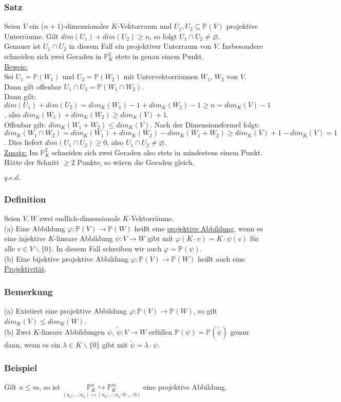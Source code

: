 \documentclass[a4paper]{article}
\newcommand{\ul}{\underline}
\renewcommand{\proof}{\ul{Beweis:}\\}
\renewcommand{\qed}{\begin{flushright}
\ul{\(q.e.d.\)}
\end{flushright}}
\let\phi\varphi
\begin{document}
\subsubsection{Satz}
Seien \(V\) ein (\(n+1\))-dimensionaler \(K\)-Vektorraum und \(U_1,U_2\subseteq\mathbb{P}(V)\) projektive Unterräume. Gilt \(dim(U_1)+dim(U_2)\geq n\), so folgt \(U_1\cap U_2\ne\varnothing\).\\
Genauer ist \(U_1\cap U_2\) in diesem Fall ein projektiver Unterraum von \(V\). Insbesondere schneiden sich zwei Geraden in \(\mathbb{P}_K^2\) stets in genau einem Punkt.\\
\proof
Sei \(U_1=\mathbb{P}(W_1)\) und \(U_2=\mathbb{P}(W_2)\) mit Untervektorräumen \(W_1\), \(W_2\) von \(V\). Dann gilt offenbar \(U_1\cap U_2=\mathbb{P}(W_1\cap W_2)\).\\
Dann gilt: \(dim(U_1)+dim(U_2)=dim_K(W_1)-1+dim_K(W_2)-1\geq n=dim_K(V)-1\), also \(dim_K(W_1)+dim_K(W_2)\geq dim_K(V)+1\).\\
Offenbar gilt: \(dim_K(W_1+W_2)\leq dim_K(V)\). Nach der Dimensionsformel folgt:\\
\(dim_K(W_1\cap W_2)=dim_K(W_1)+dim_K(W_2)-dim_K(W_1+W_2)\geq dim_K(V)+1-dim_K(V)=1\). Dies liefert \(dim(U_1\cap U_2)\geq 0\), also \(U_1\cap U_2\neq \varnothing\).\\
\ul{Zusatz:} Im \(\mathbb{P}_K^2\) schneiden sich zwei Geraden also stets in mindestens einem Punkt. Hätte der Schnitt \(\geq 2\) Punkte, so wären die Geraden gleich.
\qed
\subsubsection{Definition}
Seien \(V,W\) zwei endlich-dimensionale \(K\)-Vektorräume.\\
(a) Eine Abbildung \(\phi:\mathbb{P}(V)\rightarrow\mathbb{P}(W)\) heißt eine \ul{projektive Abbildung}, wenn es eine injektive \(K\)-lineare Abbildung \(\psi:V\rightarrow W\) gibt mit \(\phi(K\cdot v)=K\cdot\psi(v)\) für alle \(v\in V\backslash\{0\}\). In diesem Fall schreiben wir auch \(\phi=\mathbb{P}(\psi)\).\\
(b) Eine bijektive projektive Abbildung \(\phi:\mathbb{P}(V)\rightarrow\mathbb{P}(W)\) heißt auch eine \ul{Projektivität}.
\subsubsection{Bemerkung}
(a) Existiert eine projektive Abbildung \(\phi:\mathbb{P}(V)\rightarrow\mathbb{P}(W)\), so gilt \(dim_K(V)\leq dim_K(W)\).\\
(b) Zwei \(K\)-lineare Abbildungen \(\psi\), \(\tilde{\psi}:V\rightarrow W\) erfüllen \(\mathbb{P}(\psi)=\mathbb{P}(\tilde{\psi})\) genau dann, wenn es ein \(\lambda\in K\backslash\{0\}\) gibt mit \(\tilde{\psi}=\lambda\cdot\psi\).
\subsubsection{Beispiel}
Gilt \(n\leq m\), so ist \(\underset{(a_0:\dots:a_n)\mapsto(a_0:\dots:a_n:0:\dots:0)}{\mathbb{P}_K^n\hookrightarrow\mathbb{P}_K^m}\) eine projektive Abbildung.
\end{document}
